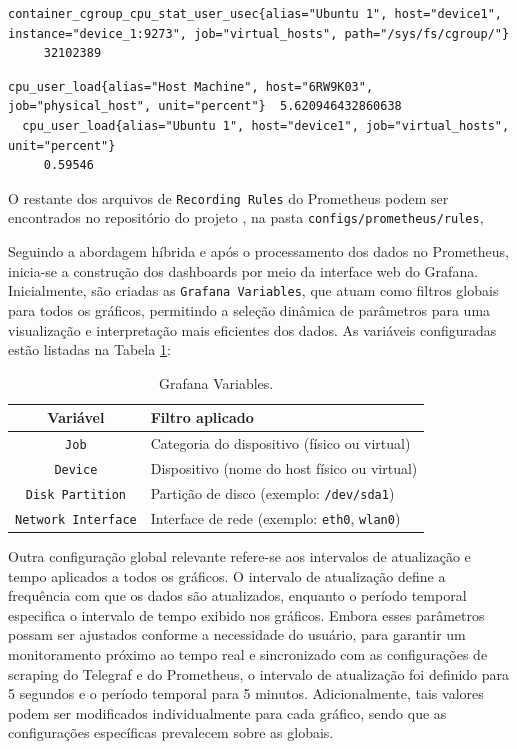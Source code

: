 {\begin{lstlisting}[caption={Métricas de CPU "Carga de usuário"\ pré-normalização}, label={lst:telegraf-cpu-user-load}]
  container_cgroup_cpu_stat_user_usec{alias="Ubuntu 1", host="device1", instance="device_1:9273", job="virtual_hosts", path="/sys/fs/cgroup/"}
     32102389
\end{lstlisting}

\begin{lstlisting}[caption={Métricas de CPU "Carga de usuário"\ normalizadas}, label={lst:normalized-cpu-user-load}]
  cpu_user_load{alias="Host Machine", host="6RW9K03", job="physical_host", unit="percent"}	5.620946432860638 
  cpu_user_load{alias="Ubuntu 1", host="device1", job="virtual_hosts", unit="percent"}	
     0.59546
\end{lstlisting}

O restante dos arquivos de \verb|Recording Rules| do Prometheus podem ser encontrados no repositório do projeto \citep{vitorcossetti2025}, na pasta \verb|configs/prometheus/rules|, 

Seguindo a abordagem híbrida e após o processamento dos dados no Prometheus, inicia-se a construção dos dashboards por meio da interface web do Grafana. Inicialmente, são criadas as \verb|Grafana Variables|, que atuam como filtros globais para todos os gráficos, permitindo a seleção dinâmica de parâmetros para uma visualização e interpretação mais eficientes dos dados. As variáveis configuradas estão listadas na Tabela \ref{tab:grafana-variables}:

\begin{table}[H]
\centering
\caption{Grafana Variables.}
\label{tab:grafana-variables}
\color{red}
\begin{tabular}{cl}
\toprule
\textbf{Variável} & \textbf{Filtro aplicado} \\
\midrule
\verb|Job| & Categoria do dispositivo (físico ou virtual) \\
\verb|Device| & Dispositivo (nome do host físico ou virtual) \\
\verb|Disk Partition| & Partição de disco (exemplo: \verb|/dev/sda1|) \\
\verb|Network Interface| & Interface de rede (exemplo: \verb|eth0|, \verb|wlan0|) \\
\bottomrule
\end{tabular}
\end{table}

Outra configuração global relevante refere-se aos intervalos de atualização e tempo aplicados a todos os gráficos. O intervalo de atualização define a frequência com que os dados são atualizados, enquanto o período temporal especifica o intervalo de tempo exibido nos gráficos. Embora esses parâmetros possam ser ajustados conforme a necessidade do usuário, para garantir um monitoramento próximo ao tempo real e sincronizado com as configurações de scraping do Telegraf e do Prometheus, o intervalo de atualização foi definido para 5 segundos e o período temporal para 5 minutos. Adicionalmente, tais valores podem ser modificados individualmente para cada gráfico, sendo que as configurações específicas prevalecem sobre as globais.


}
